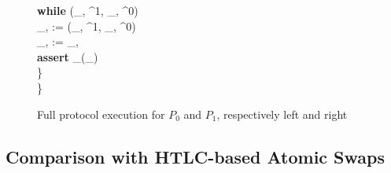 \begin{figure}[H]
\begin{minipage}[t]{0.5\textwidth}
\begin{pchstack}[boxed]
{	\qquad \textbf{while} \: \not\exists \:  \in \st \mid (\pk_{, \bcb}^1, \pk_{, \bcb}^0) \in {} \\
	\qquad \tx_{, \bcb} :=  \in \st \mid (\pk_{, \bcb}^1, \pk_{, \bcb}^0) \in {} \\
	\qquad \tx_{, \bca} :=  \oplus  \tx_{, \bcb} \\
	\qquad \textbf{assert} \: _\bca(\tx_{}) \\
        \quad \} \\
        \} \\
    }
    \end{pchstack}
    \end{minipage}%
    \caption{Full protocol execution for $P_0$ and $P_1$, respectively left and right}
    \label{fig:generic_atomic_protocol}
    \end{figure}

\subsection{Comparison with HTLC-based Atomic Swaps}

\newpage
